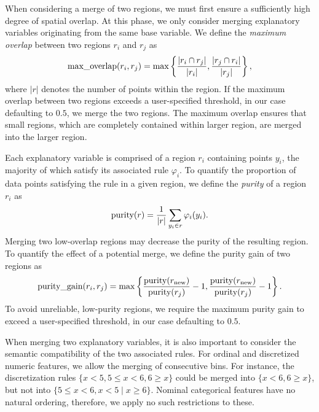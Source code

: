 \documentclass[lettersize,journal]{IEEEtran}
\begin{document}
When considering a merge of two regions, we must first ensure a sufficiently high degree of spatial overlap. At this phase, we only consider merging explanatory variables originating from the same base variable.
We define the \textit{maximum overlap} between two regions $r_i$ and $r_j$ as
\begin{equation}
\text{max\_overlap}(r_i, r_j) = \max \left \{ \frac{|r_i \cap r_j|}{|r_i|}, \frac{|r_j \cap r_i|}{|r_j|} \right \}, \notag
\end{equation}
where $|r|$ denotes the number of points within the region. If the maximum overlap between two regions exceeds a user-specified threshold, in our case defaulting to $0.5$, we merge the two regions.
The maximum overlap ensures that small regions, which are completely contained within larger region, are merged into the larger region.

Each explanatory variable is comprised of a region $r_i$ containing points $y_i$, the majority of which satisfy its associated rule $\varphi_i$. To quantify the proportion of data points satisfying the rule in a given region, we define the \textit{purity} of a region $r_i$ as
\begin{equation}
\text{purity}(r) = \frac{1}{|r|} \sum_{y_i \in r} \varphi_i (y_i). \notag
\end{equation}
Merging two low-overlap regions may decrease the purity of the resulting region.
To quantify the effect of a potential merge, we define the purity gain of two regions as
\begin{equation}
\text{purity\_gain}(r_i, r_j) = \max \left \{ \frac{\text{purity}(r_{\text{new}})}{\text{purity}(r_j)} - 1, \frac{\text{purity}(r_{\text{new}})}{\text{purity}(r_j)} - 1 \right \}. \notag
\end{equation}
To avoid unreliable, low-purity regions, we require the maximum purity gain to exceed a user-specified threshold, in our case defaulting to $0.5$.

When merging two explanatory variables, it is also important to consider the semantic compatibility of the two associated rules.
For ordinal and discretized numeric features, we allow the merging of consecutive bins. For instance, the discretization rules $\{ x < 5, 5 \leq x < 6, 6 \geq x\}$ could be merged into $\{x < 6, 6 \geq x\}$, but not into $\{ 5 \leq x < 6, x < 5 \mid x \geq 6\}$.
Nominal categorical features have no natural ordering, therefore, we apply no such restrictions to these.
\end{document}
